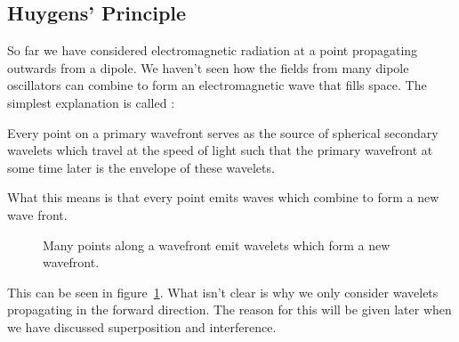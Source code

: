     \subsection{Huygens' Principle}\label{sec:huygens principle}
    So far we have considered electromagnetic radiation at a point propagating outwards from a dipole.
    We haven't seen how the fields from many dipole oscillators can combine to form an electromagnetic wave that fills space.
    The simplest explanation is called :
    \begin{displayquote}
        Every point on a primary wavefront serves as the source of spherical secondary wavelets which travel at the speed of light such that the primary wavefront at some time later is the envelope of these wavelets.
    \end{displayquote}
    What this means is that every point emits waves which combine to form a new wave front.
    \begin{figure}[ht]
        \centering
        \caption{Many points along a wavefront emit wavelets which form a new wavefront.}
        \label{fig:huygens principle}
    \end{figure}
    This can be seen in figure~\ref{fig:huygens principle}.
    What isn't clear is why we only consider wavelets propagating in the forward direction.
    The reason for this will be given later when we have discussed superposition and interference.
    
